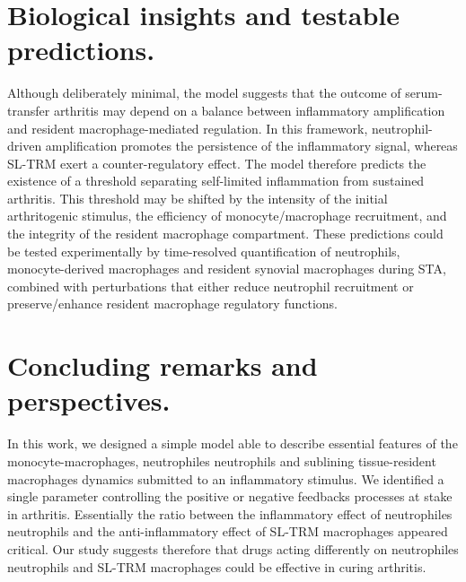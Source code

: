 \documentclass[a4paper, 12pt]{article}
\providecommand{\DIFaddtex}[1]{{\protect\color{blue} \sf #1}} %
\providecommand{\DIFdeltex}[1]{{\protect\color{red} \scriptsize #1}} %
\providecommand{\DIFaddbegin}{} %
\providecommand{\DIFaddend}{} %
\providecommand{\DIFdelbegin}{} %
\providecommand{\DIFdelend}{} %
\providecommand{\DIFadd}[1]{\texorpdfstring{\DIFaddtex{#1}}{#1}} %
\providecommand{\DIFdel}[1]{\texorpdfstring{\DIFdeltex{#1}}{}} %
\begin{document}
\section{Biological insights and testable predictions.}\label{sec:insights_predictions}
Although deliberately minimal, 
the model suggests that the outcome of serum-transfer arthritis may depend on a balance between inflammatory amplification and resident macrophage-mediated regulation. 
In this framework, neutrophil-driven amplification promotes the persistence of the inflammatory signal, whereas SL-TRM exert a counter-regulatory effect. 
The model therefore predicts the existence of a threshold separating self-limited inflammation from sustained arthritis. 
This threshold may be shifted by the intensity of the initial arthritogenic stimulus, the efficiency of monocyte/macrophage recruitment, and the integrity of the resident macrophage compartment. 
These predictions could be tested experimentally by time-resolved quantification of neutrophils, monocyte-derived macrophages and resident synovial macrophages during STA, 
combined with perturbations that either reduce neutrophil recruitment or preserve/enhance resident macrophage regulatory functions.



\section{Concluding remarks and perspectives.}\label{sec:conclusion} In this work, we designed a simple model able to describe essential features of the monocyte-macrophages, \DIFdelbegin \DIFdel{neutrophiles }\DIFdelend \DIFaddbegin \DIFadd{neutrophils }\DIFaddend and sublining tissue-resident macrophages dynamics
 submitted to an inflammatory stimulus.
We identified a single parameter controlling the positive or negative feedbacks processes at stake in arthritis. 
Essentially the ratio between the inflammatory effect of \DIFdelbegin \DIFdel{neutrophiles }\DIFdelend \DIFaddbegin \DIFadd{neutrophils }\DIFaddend and the anti-inflammatory effect of SL-TRM macrophages appeared critical. 
Our study suggests therefore that drugs acting differently on \DIFdelbegin \DIFdel{neutrophiles }\DIFdelend \DIFaddbegin \DIFadd{neutrophils }\DIFaddend and SL-TRM macrophages could be effective in curing arthritis.
\end{document}
